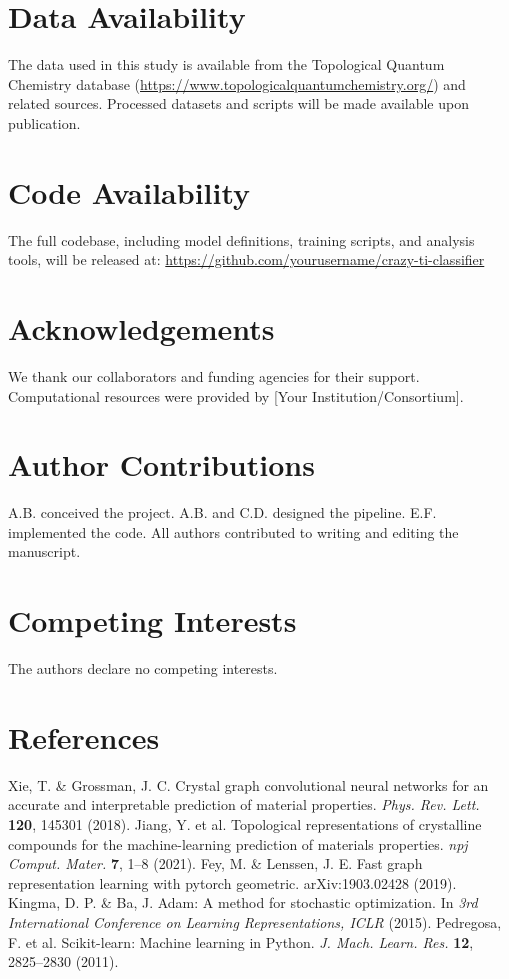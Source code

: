 \documentclass[12pt]{article}
\begin{document}
\section{Data Availability}
The data used in this study is available from the Topological Quantum Chemistry database (\url{https://www.topologicalquantumchemistry.org/}) and related sources. Processed datasets and scripts will be made available upon publication.

\section{Code Availability}
The full codebase, including model definitions, training scripts, and analysis tools, will be released at: \url{https://github.com/yourusername/crazy-ti-classifier}

\section{Acknowledgements}
We thank our collaborators and funding agencies for their support. Computational resources were provided by [Your Institution/Consortium].

\section{Author Contributions}
A.B. conceived the project. A.B. and C.D. designed the pipeline. E.F. implemented the code. All authors contributed to writing and editing the manuscript.

\section{Competing Interests}
The authors declare no competing interests.

\section{References}
\begin{thebibliography}{99}
 Xie, T. \& Grossman, J. C. Crystal graph convolutional neural networks for an accurate and interpretable prediction of material properties. \textit{Phys. Rev. Lett.} \textbf{120}, 145301 (2018).
 Jiang, Y. et al. Topological representations of crystalline compounds for the machine-learning prediction of materials properties. \textit{npj Comput. Mater.} \textbf{7}, 1--8 (2021).
 Fey, M. \& Lenssen, J. E. Fast graph representation learning with pytorch geometric. arXiv:1903.02428 (2019).
 Kingma, D. P. \& Ba, J. Adam: A method for stochastic optimization. In \textit{3rd International Conference on Learning Representations, ICLR} (2015).
 Pedregosa, F. et al. Scikit-learn: Machine learning in Python. \textit{J. Mach. Learn. Res.} \textbf{12}, 2825--2830 (2011).
\end{thebibliography}
\end{document}
